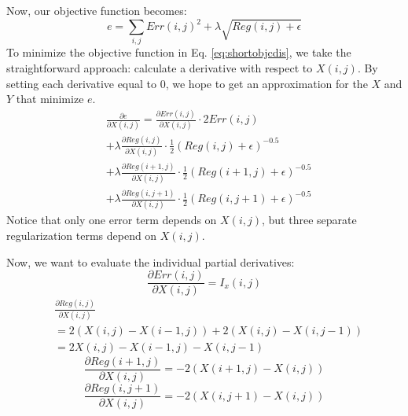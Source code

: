 \documentclass[10pt,twocolumn,letterpaper]{article}
\begin{document}
Now, our objective function becomes:
\begin{equation} \label{eq:shortobjcdis}
e = \sum_{i,j} Err(i,j)^2 + \lambda \sqrt{Reg(i,j) + \epsilon }
\end{equation}
To minimize the objective function in Eq. \ref{eq:shortobjcdis}, we take the straightforward approach: calculate a derivative with respect to $X(i, j)$.  By setting each derivative equal to $0$, we hope to get an approximation for the $X$ and $Y$ that minimize $e$.
\begin{equation}
\begin{aligned}
&\frac{\partial e}{\partial X(i, j)} = \frac{\partial Err(i,j)}{\partial X(i, j)} \cdot 2 Err(i, j) \\
&+ \lambda \frac{\partial Reg(i,j)}{\partial X(i, j)} \cdot \frac{1}{2} (Reg(i, j) + \epsilon)^{-0.5}  \\
&+ \lambda \frac{\partial Reg(i+1,j)}{\partial X(i, j)} \cdot \frac{1}{2} (Reg(i+1, j) + \epsilon)^{-0.5}  \\
&+ \lambda \frac{\partial Reg(i,j+1)}{\partial X(i, j)} \cdot \frac{1}{2} (Reg(i, j+1) + \epsilon)^{-0.5}
\end{aligned}
\label{eq:dedx}
\end{equation}
Notice that only one error term depends on $X(i, j)$, but three separate regularization terms depend on $X(i, j)$.

Now, we want to evaluate the individual partial derivatives:
\begin{equation} \label{eq:derrdx}
\frac{\partial Err(i,j)}{\partial X(i, j)} = I_x(i, j)
\end{equation}
\begin{equation} \label{eq:dreg1dx}
\begin{aligned}
&\frac{\partial Reg(i,j)}{\partial X(i, j)} \\
&= 2(X(i, j) - X(i-1, j)) + 2(X(i, j) - X(i, j-1)) \\
&= 2X(i,j) - X(i-1, j) - X(i,j-1)
\end{aligned}
\end{equation}
\begin{equation} \label{eq:dreg2dx}
\frac{\partial Reg(i+1,j)}{\partial X(i, j)} = -2(X(i+1,j) - X(i,j))
\end{equation}
\begin{equation} \label{eq:dreg3dx}
\frac{\partial Reg(i,j+1)}{\partial X(i, j)} = -2(X(i,j+1) - X(i,j))
\end{equation}
\end{document}
